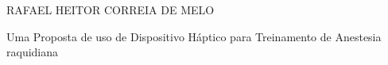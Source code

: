 \cleardoublepage


\pagestyle{ruledheader}
\setcounter{page}{1}

\cleardoublepage
\thispagestyle{empty}

\vspace{-60mm}

\begin{center}
   {\large RAFAEL HEITOR CORREIA DE MELO}\\
   \vspace{7mm}

   Uma Proposta de uso de Dispositivo Háptico
para Treinamento de Anestesia raquidiana\\
  \vspace{10mm}
\end{center}

